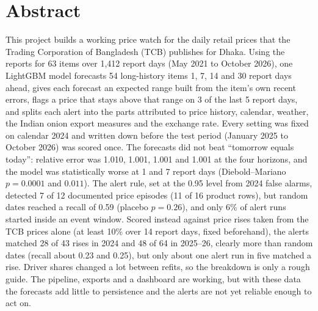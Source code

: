 \chapter*{Abstract}
This project builds a working price watch for the daily retail prices that the Trading Corporation of Bangladesh (TCB) publishes for Dhaka. Using the reports for 63 items over 1,412 report days (May 2021 to October 2026), one LightGBM model forecasts 54 long-history items 1, 7, 14 and 30 report days ahead, gives each forecast an expected range built from the item's own recent errors, flags a price that stays above that range on 3 of the last 5 report days, and splits each alert into the parts attributed to price history, calendar, weather, the Indian onion export measures and the exchange rate. Every setting was fixed on calendar 2024 and written down before the test period (January 2025 to October 2026) was scored once. The forecasts did not beat ``tomorrow equals today'': relative error was 1.010, 1.001, 1.001 and 1.001 at the four horizons, and the model was statistically worse at 1 and 7 report days (Diebold--Mariano $p=0.0001$ and $0.011$). The alert rule, set at the 0.95 level from 2024 false alarms, detected 7 of 12 documented price episodes (11 of 16 product rows), but random dates reached a recall of 0.59 (placebo $p=0.26$), and only 6\% of alert runs started inside an event window. Scored instead against price rises taken from the TCB prices alone (at least 10\% over 14 report days, fixed beforehand), the alerts matched 28 of 43 rises in 2024 and 48 of 64 in 2025--26, clearly more than random dates (recall about 0.23 and 0.25), but only about one alert run in five matched a rise. Driver shares changed a lot between refits, so the breakdown is only a rough guide. The pipeline, exports and a dashboard are working, but with these data the forecasts add little to persistence and the alerts are not yet reliable enough to act on.
